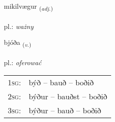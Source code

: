 \documentclass[frontgrid, backgrid]{flacards}\usepackage[]{graphicx}\usepackage[]{xcolor}
\begin{document}
{mikilvægur \small{\textsubscript{(\textit{adj.})}} \\[1ex] %
\textphonetic{[mɪːcɪlvaiɣʏr]} \\
pl.: \emph{ważny} \\  [2ex]
\renewcommand*{\arraystretch}{0.8}
}

\renewcommand{\flhead}{\vskip5pt \fboxsep=0pt {\small\bfseries\footnotesize Sagnorð | czasownik}}
\renewcommand{\fcfoot}{\vskip5pt \fboxsep=0pt \hspace{2pt}{\small\bfseries\footnotesize 1K}}

\renewcommand{\blhead}{\vskip5pt {\small\bfseries\footnotesize Sagnorð | czasownik }}
\renewcommand{\bcfoot}{\vskip5pt \hspace{2pt}{\small\bfseries\footnotesize 1K}}


{bjóða \small{\textsubscript{(\textit{v.})}} \\[1ex] %
\textphonetic{[pjouːða]} \\
pl.: \emph{oferować} \\  [2ex]
\renewcommand*{\arraystretch}{0.8}
\begin{tabular}{p{1cm}l}
\textsc{1sg}: & býð -- bauð -- boðið \\ 
\textsc{2sg}: & býður -- bauðst -- boðið \\ 
\textsc{3sg}: & býður -- bauð -- boðið \\ 
\end{tabular}
}

\renewcommand{\flhead}{\vskip5pt \fboxsep=0pt {\small\bfseries\footnotesize Nafnorð | rzeczownik}}
\renewcommand{\fcfoot}{\vskip5pt \fboxsep=0pt \hspace{2pt}{\small\bfseries\footnotesize 1K}}
\end{document}
